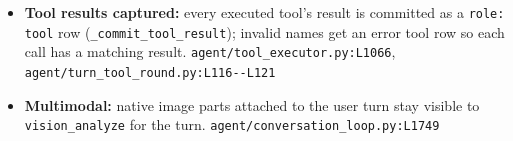 \begin{itemize}
\item \textbf{Tool results captured:} every executed tool's result is committed as a \texttt{role:\allowbreak{} tool} row (\texttt{\_\allowbreak{}commit\_\allowbreak{}tool\_\allowbreak{}result}); invalid names get an error tool row so each call has a matching result. \texttt{agent/\allowbreak{}tool\_\allowbreak{}executor.\allowbreak{}py:\allowbreak{}L1066}, \texttt{agent/\allowbreak{}turn\_\allowbreak{}tool\_\allowbreak{}round.\allowbreak{}py:\allowbreak{}L116-\allowbreak{}-\allowbreak{}L121}
\item \textbf{Multimodal:} native image parts attached to the user turn stay visible to \texttt{vision\_\allowbreak{}analyze} for the turn. \texttt{agent/\allowbreak{}conversation\_\allowbreak{}loop.\allowbreak{}py:\allowbreak{}L1749}
\end{itemize}

